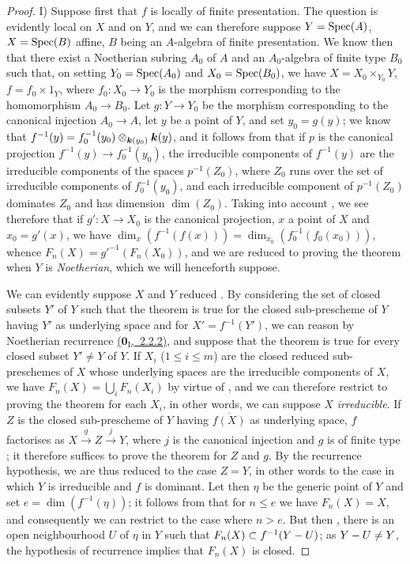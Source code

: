 \begin{proof}
I) Suppose first that $f$ is locally of finite presentation.
The question is evidently local on $X$ and on $Y$, and we can therefore suppose $Y=\operatorname{Spec}(A)$, $X=\operatorname{Spec}(B)$ affine, $B$ being an $A$-algebra of finite presentation.
We know then  that there exist a Noetherian subring $A_0$ of $A$ and an $A_0$-algebra of finite type $B_0$ such that, on setting $Y_0=\operatorname{Spec}(A_0)$ and $X_0=\operatorname{Spec}(B_0)$, we have $X=X_0\times_{Y_0}Y$, $f=f_0\times 1_Y$,
where $f_0:X_0\to Y_0$ is the morphism corresponding to the homomorphism $A_0\to B_0$.
Let $g:Y\to Y_0$ be the morphism corresponding to the canonical injection $A_0\to A$, let $y$ be a point of $Y$, and set $y_0=g(y)$; we know that $f^{-1}(y)=f_0^{-1}(y_0)\otimes_{\boldsymbol{k}(y_0)}\boldsymbol{k}(y)$, and it follows from  that if $p$ is the canonical projection $f^{-1}(y)\to f_0^{-1}(y_0)$, the irreducible components of $f^{-1}(y)$ are the irreducible components of the spaces $p^{-1}(Z_0)$, where $Z_0$ runs over the set of irreducible components of $f_0^{-1}(y_0)$, and each irreducible component of $p^{-1}(Z_0)$ dominates $Z_0$ and has dimension $\dim(Z_0)$.
Taking into account , we see therefore that if $g':X\to X_0$ is the canonical projection, $x$ a point of $X$ and $x_0=g'(x)$, we have $\dim_x(f^{-1}(f(x)))=\dim_{x_0}(f_0^{-1}(f_0(x_0)))$, whence $F_n(X)={g'}^{-1}(F_n(X_0))$, and we are reduced to proving the theorem when $Y$ is \emph{Noetherian}, which we will henceforth suppose.

We can evidently suppose $X$ and $Y$ reduced .
By considering the set of closed subsets $Y'$ of $Y$ such that the theorem is true for the closed sub-prescheme of $Y$ having $Y'$ as underlying space and for $X'=f^{-1}(Y')$, we can reason by Noetherian recurrence \hyperref[0.2.2.2]{($\mathbf{0}_{\mathrm{I}}$,~2.2.2)}, and suppose that the theorem is true for every closed subset $Y'\neq Y$ of $Y$.
If $X_i$ ($1\leq i\leq m$) are the closed reduced sub-preschemes of $X$ whose underlying spaces are the irreducible components of $X$, we have $F_n(X)=\bigcup_iF_n(X_i)$ by virtue of , and we can therefore restrict to proving the theorem for each $X_i$, in other words, we can suppose $X$ \emph{irreducible}.
If $Z$ is the closed sub-prescheme of $Y$ having $\overline{f(X)}$ as underlying space, $f$ factorises as $X\xrightarrow{g}Z\xrightarrow{j}Y$, where $j$ is the canonical injection  and $g$ is of finite type ; it therefore suffices to prove the theorem for $Z$ and $g$. By the recurrence hypothesis, we are thus reduced to the case $Z=Y$, in other words to the case in which $Y$ is irreducible and $f$ is dominant.
Let then $\eta$ be the generic point of $Y$ and set $e=\dim(f^{-1}(\eta))$; it follows from  that for $n\leq e$ we have $F_n(X)=X$, and consequently we can restrict to the case where $n>e$.
But then , there is an open neighbourhood $U$ of $\eta$ in $Y$ such that $F_n(X)\subset f^{-1}(Y- U)$; as $Y- U\neq Y$, the hypothesis of recurrence implies that $F_n(X)$ is closed.


\end{proof}
